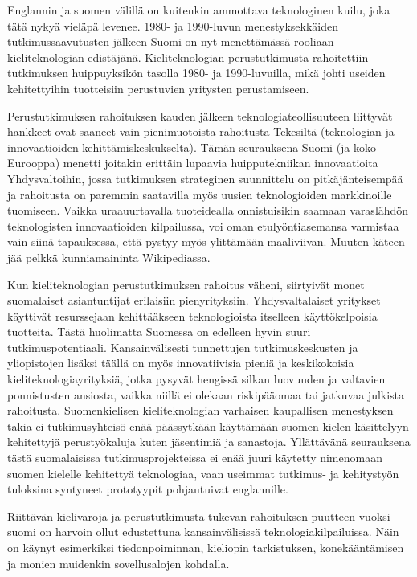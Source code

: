 \begin{multicols}{2}
Englannin ja suomen välillä on kuitenkin ammottava teknologinen kuilu, joka tätä nykyä vieläpä levenee. 1980- ja 1990-luvun menestyksekkäiden tutkimussaavutusten jälkeen Suomi on nyt menettämässä rooliaan kieliteknologian edistäjänä. Kieliteknologian perustutkimusta rahoitettiin tutkimuksen huippuyksikön tasolla 1980- ja 1990-luvuilla, mikä johti useiden kehitettyihin tuotteisiin perustuvien yritysten perustamiseen.

Perustutkimuksen rahoituksen kauden jälkeen teknologiateollisuuteen liittyvät hankkeet ovat saaneet vain pienimuotoista rahoitusta Tekesiltä (teknologian ja innovaatioiden kehittämiskeskukselta). Tämän seurauksena Suomi (ja koko Eurooppa) menetti joitakin erittäin lupaavia huipputekniikan innovaatioita Yhdysvaltoihin, jossa tutkimuksen strateginen suunnittelu on pitkäjänteisempää ja rahoitusta on paremmin saatavilla myös uusien teknologioiden markkinoille tuomiseen. Vaikka uraauurtavalla tuoteidealla onnistuisikin saamaan varaslähdön teknologisten innovaatioiden kilpailussa, voi oman etulyöntiasemansa varmistaa vain siinä tapauksessa, että pystyy myös ylittämään maaliviivan.  Muuten käteen jää pelkkä kunniamaininta Wikipediassa.

Kun kieliteknologian perustutkimuksen rahoitus väheni, siirtyivät monet suomalaiset asiantuntijat erilaisiin pienyrityksiin. Yhdysvaltalaiset yritykset käyttivät resurssejaan kehittääkseen teknologioista itselleen käyttökelpoisia tuotteita. Tästä huolimatta Suomessa on edelleen hyvin suuri tutkimuspotentiaali. Kansainvälisesti tunnettujen tutkimuskeskusten ja yliopistojen lisäksi täällä on myös innovatiivisia pieniä ja keskikokoisia kieliteknologiayrityksiä, jotka pysyvät hengissä silkan luovuuden ja valtavien ponnistusten ansiosta, vaikka niillä ei olekaan riskipääomaa tai jatkuvaa julkista rahoitusta.
Suomenkielisen kieliteknologian varhaisen kaupallisen menestyksen takia ei tutkimusyhteisö enää päässytkään käyttämään suomen kielen käsittelyyn kehitettyjä perustyökaluja kuten jäsentimiä ja sanastoja. Yllättävänä seurauksena tästä suomalaisissa tutkimusprojekteissa ei enää juuri käytetty nimenomaan suomen kielelle kehitettyä teknologiaa, vaan useimmat tutkimus- ja kehitystyön tuloksina syntyneet prototyypit pohjautuivat englannille.

Riittävän kielivaroja ja perustutkimusta tukevan rahoituksen puutteen vuoksi suomi on harvoin ollut edustettuna kansainvälisissä teknologiakilpailuissa. Näin on käynyt esimerkiksi tiedonpoiminnan, kieliopin tarkistuksen, konekääntämisen ja monien muidenkin sovellusalojen kohdalla.


\end{multicols}
